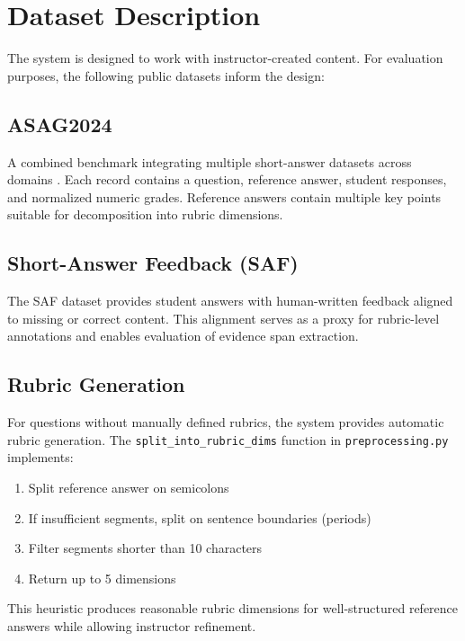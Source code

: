 \documentclass[conference]{IEEEtran}
\begin{document}
\section{Dataset Description}
The system is designed to work with instructor-created content. For evaluation purposes, the following public datasets inform the design:

\subsection{ASAG2024}
A combined benchmark integrating multiple short-answer datasets across domains \cite{asag2024}. Each record contains a question, reference answer, student responses, and normalized numeric grades. Reference answers contain multiple key points suitable for decomposition into rubric dimensions.

\subsection{Short-Answer Feedback (SAF)}
The SAF dataset \cite{saf2022} provides student answers with human-written feedback aligned to missing or correct content. This alignment serves as a proxy for rubric-level annotations and enables evaluation of evidence span extraction.

\subsection{Rubric Generation}
For questions without manually defined rubrics, the system provides automatic rubric generation. The \texttt{split\_into\_rubric\_dims} function in \texttt{preprocessing.py} implements:
\begin{enumerate}
    \item Split reference answer on semicolons
    \item If insufficient segments, split on sentence boundaries (periods)
    \item Filter segments shorter than 10 characters
    \item Return up to 5 dimensions
\end{enumerate}

This heuristic produces reasonable rubric dimensions for well-structured reference answers while allowing instructor refinement.
\end{document}
